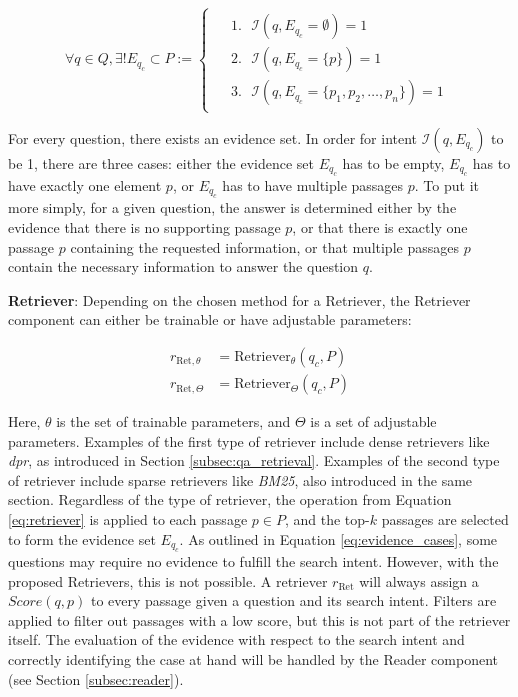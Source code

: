 \begin{equation}
    \forall q \in Q, \exists! E_{q_c} \subset P  := 
    \begin{cases}
        \begin{aligned}
            &1. \text{ } \mathcal{I}(q,E_{q_c} = \emptyset) = 1 \\
            &2. \text{ } \mathcal{I}(q,E_{q_c} = \{p\}) = 1 \\
            &3. \text{ } \mathcal{I}(q,E_{q_c} = \{p_1, p_2, \dots, p_n\}) = 1
        \end{aligned}
    \end{cases}
    \label{eq:evidence_cases}
\end{equation}

For every question, there exists an evidence set. In order for intent $\mathcal{I}(q,E_{q_c})$ to be 1, there are three cases: either the evidence set $E_{q_c}$ has to be empty, $E_{q_c}$ has to have exactly one element $p$, or $E_{q_c}$ has to have multiple passages $p$. To put it more simply, for a given question, the answer is determined either by the evidence that there is no supporting passage $p$, or that there is exactly one passage $p$ containing the requested information, or that multiple passages $p$ contain the necessary information to answer the question $q$.

\vspace{\baselineskip}

\textbf{Retriever}: Depending on the chosen method for a Retriever, the Retriever component can either be trainable or have adjustable parameters:

\begin{align}
    r_{\text{Ret}, \theta} &= \text{Retriever}_\theta(q_c, P) \\
    r_{\text{Ret}, \Theta} &= \text{Retriever}_\Theta(q_c, P)
\end{align}

Here, $\theta$ is the set of trainable parameters, and $\Theta$ is a set of adjustable parameters. Examples of the first type of retriever include dense retrievers like \textit{\gls{dpr}}, as introduced in Section \ref{subsec:qa_retrieval}. Examples of the second type of retriever include sparse retrievers like \textit{BM25}, also introduced in the same section. Regardless of the type of retriever, the operation from Equation \ref{eq:retriever} is applied to each passage $p \in P$, and the top-$k$ passages are selected to form the evidence set $E_{q_c}$. As outlined in Equation \ref{eq:evidence_cases}, some questions may require no evidence to fulfill the search intent. However, with the proposed Retrievers, this is not possible. A retriever $r_{\text{Ret}}$ will always assign a $Score(q,p)$ to every passage given a question and its search intent. Filters are applied to filter out passages with a low score, but this is not part of the retriever itself. The evaluation of the evidence with respect to the search intent and correctly identifying the case at hand will be handled by the Reader component (see Section \ref{subsec:reader}).

